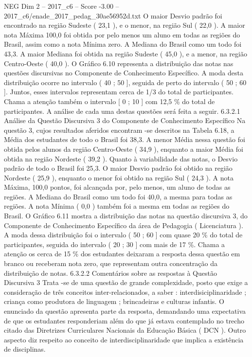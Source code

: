 \begin{textsample}{NEG Dim 2 – 2017\_c6 – Score -3.00 – 2017\_c6/enade\_2017\_pedag\_30ae56952d.txt}
O maior Desvio padrão foi encontrado na região Sudeste ( 23,1 ), e o menor, na região Sul ( 22,0 ).
A maior nota Máxima 100,0 foi obtida por pelo menos um aluno em todas as regiões do Brasil, assim como a nota Mínima zero.
A Mediana do Brasil como um todo foi 43,3.
A maior Mediana foi obtida na região Sudeste ( 45,0 ), e a menor, na região Centro-Oeste ( 40,0 ).
O Gráfico 6.10 representa a distribuição das notas nas questões discursivas no Componente de Conhecimento Específico.
A moda desta distribuição ocorre no intervalo ( 40 ; 50 ], seguida de perto do intervalo ( 50 ; 60 ].
Juntos, esses intervalos representam cerca de 1/3 do total de participantes.
Chama a atenção também o intervalo [ 0 ; 10 ] com 12,5 \% do total de participantes.
A análise de cada uma destas questões será feita a seguir. 6.3.2.1 Análise da Questão Discursiva 3 do Componente de Conhecimento Específico Na questão 3, cujos resultados aferidos encontram -se descritos na Tabela 6.18, a Média dos estudantes de todo o Brasil foi 38,3.
A menor Média nessa questão foi obtida pelos alunos da região Centro-Oeste ( 34,9 ), enquanto a maior Média foi obtida na região Nordeste ( 39,2 ).
Quanto à variabilidade das notas, o Desvio padrão de todo o Brasil foi 25,3.
O maior Desvio padrão foi obtido na região Nordeste ( 25,9 ), enquanto o menor foi obtido na região Sul ( 24,3 ).
A nota Máxima, 100,0 pontos, foi alcançada por, pelo menos, um aluno de todas as regiões.
A Mediana do Brasil como um todo foi 40,0, a mesma para todas as regiões.
A nota Mínima ( 0,0 ) também foi a mesma em todas as regiões do Brasil.
O Gráfico 6.11 mostra a distribuição das notas na questão discursiva 3, do Componente de Conhecimento Específico da área de Pedagogia ( Licenciatura ).
A moda dessa distribuição foi o intervalo ( 50 ; 60 ] com quase 20 \% do total de participantes, seguida do intervalo ( 20 ; 30 ] com mais de 17 \%.
Chama a atenção os cerca de 15 \% dos estudantes deixaram a resposta dessa questão em branco ou receberam nota zero, que representam outra concentração da distribuição de notas. 6.3.2.2 Comentários sobre as respostas à Questão Discursiva 3 Trata -se de uma questão de grande complexidade, posto que exige a consideração de três conceitos inter-relacionados, a saber : interdisiciplinaridade ; criança como produtora de linguagem ; brincadeiras e culturas infantis.
O enunciado da questão apresenta parte da resposta, demandando uma expectativa de que os estudantes responderiam além do que já estava contemplado no trecho citado das Diretrizes Curriculares Nacionais da Educação Básica ( DCN ).
Outro aspecto diz respeito ao conceito de interdisciplinaridade que implica a existência de disciplinas.

\end{textsample}
